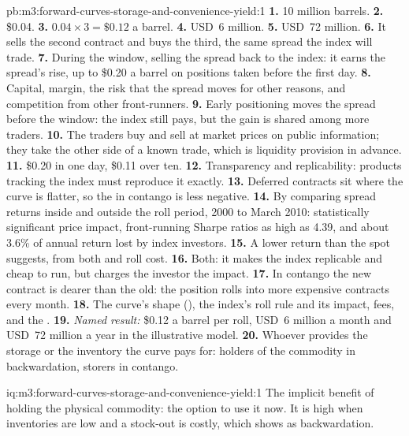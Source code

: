 \begin{solution}{pb:m3:forward-curves-storage-and-convenience-yield:1}
\textbf{1.} 10 million barrels. \textbf{2.} \$0.04. \textbf{3.} $0.04 \times 3 = \$0.12$ a barrel.
\textbf{4.} USD~6 million. \textbf{5.} USD~72 million. \textbf{6.} It sells the second contract and buys
the third, the same spread the index will trade. \textbf{7.} During the window, selling the spread back
to the index: it earns the spread's rise, up to \$0.20 a barrel on positions taken before the first day.
\textbf{8.} Capital, margin, the risk that the spread moves for other reasons, and competition from other
front-runners. \textbf{9.} Early positioning moves the spread before the window: the index still pays,
but the gain is shared among more traders. \textbf{10.} The traders buy and sell at market prices on
public information; they take the other side of a known trade, which is liquidity provision in advance.
\textbf{11.} \$0.20 in one day, \$0.11 over ten. \textbf{12.} Transparency and replicability: products
tracking the index must reproduce it exactly. \textbf{13.} Deferred contracts sit where the curve is
flatter, so the  in contango is less negative. \textbf{14.} By comparing spread returns inside
and outside the roll period, 2000 to March 2010: statistically significant price impact, front-running
Sharpe ratios as high as 4.39, and about 3.6\% of annual return lost by index investors. \textbf{15.} A
lower return than the spot suggests, from both  and roll cost. \textbf{16.} Both: it makes the
index replicable and cheap to run, but charges the investor the impact. \textbf{17.} In contango the new
contract is dearer than the old: the position rolls into more expensive contracts every month.
\textbf{18.} The curve's shape (), the index's roll rule and its impact, fees, and the . \textbf{19.} \emph{Named result:} \$0.12 a barrel per roll, USD~6 million a month and USD~72
million a year in the illustrative model. \textbf{20.} Whoever provides the storage or the inventory the
curve pays for: holders of the commodity in backwardation, storers in contango.
\end{solution}

\begin{solution}{iq:m3:forward-curves-storage-and-convenience-yield:1}
The implicit benefit of holding the physical commodity: the option to use it now. It is high when
inventories are low and a stock-out is costly, which shows as backwardation.
\end{solution}

